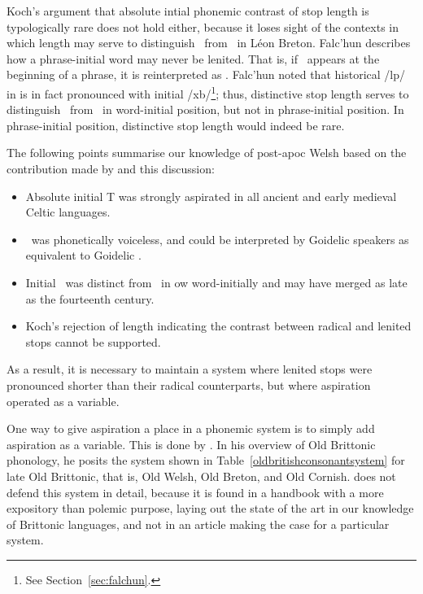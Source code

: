 Koch's argument that absolute intial phonemic contrast of stop length is typologically rare does not hold either, because it loses sight of the contexts in which length may serve to distinguish \lT\ from \xD\ in Léon Breton. Falc'hun describes how a phrase-initial word may never be lenited. That is, if \lT\ appears at the beginning of a phrase, it is reinterpreted as \xD. Falc'hun  noted that historical /\gls{l}p/ in  is in fact pronounced with initial /\gls{x}b/\footnote{See Section~\ref{sec:falchun}.}; thus, distinctive stop length serves to distinguish \lT\ from \xD\ in word-initial position, but not in phrase-initial position. In phrase-initial position, distinctive stop length would indeed be rare. %

The following points summarise our knowledge of post-\gls{apoc} Welsh based on the contribution made by \textcite{koch_*cothairche_1990} and this discussion:
\begin{itemize}
\item Absolute initial \gls{T} was strongly aspirated in all ancient and early medieval Celtic languages.
\item \lT\ was phonetically voiceless, and could be interpreted by Goidelic speakers as equivalent to Goidelic \lT.
\item Initial \lT\ was distinct from \xD\ in \gls{ow} word-initially and may have merged as late as the fourteenth century.
\item Koch's rejection of  length indicating the contrast between radical and lenited stops cannot be supported.
\end{itemize}
As a result, it is necessary to maintain a system where lenited stops were pronounced shorter than their radical counterparts, but where aspiration operated as a variable.

One way to give aspiration a place in a phonemic system is to simply add aspiration as a variable. This is done by \textcite{schrijver_old_2011}. In his overview of Old Brittonic phonology, he posits the system shown in Table~\ref{oldbritishconsonantsystem} for late Old Brittonic, that is, Old Welsh, Old Breton, and Old Cornish. \Textcite[31]{schrijver_old_2011} does not defend this system in detail, because it is found in a handbook with a more expository than polemic purpose, laying out the state of the art in our knowledge of Brittonic languages, and not in an article making the case for a particular system.


